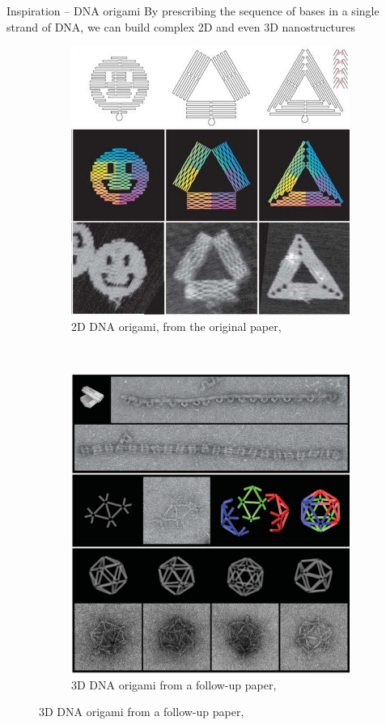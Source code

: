 \documentclass{beamer}
\theoremstyle{plain}
\theoremstyle{remark}
\begin{document}
\begin{frame}{Inspiration -- DNA origami}
	By prescribing the sequence of bases in a single strand of DNA, we can build complex 2D and even 3D nanostructures
	\begin{figure}
		\centering
		\begin{subfigure}{0.45\textwidth}
			\includegraphics[width=\linewidth]{figures/DNA_origami_cropped_more.png}
			\caption{2D DNA origami, from the original paper, \cite{rothemund2006folding}}
		\end{subfigure}
		~
		\begin{subfigure}{0.45\textwidth}
			\includegraphics[width=\linewidth]{figures/3D_DNA_origami.png}
			\caption{3D DNA origami from a follow-up paper, \cite{douglas2009self}}
		\end{subfigure}
	

\end{figure}
\end{frame}
\end{document}
